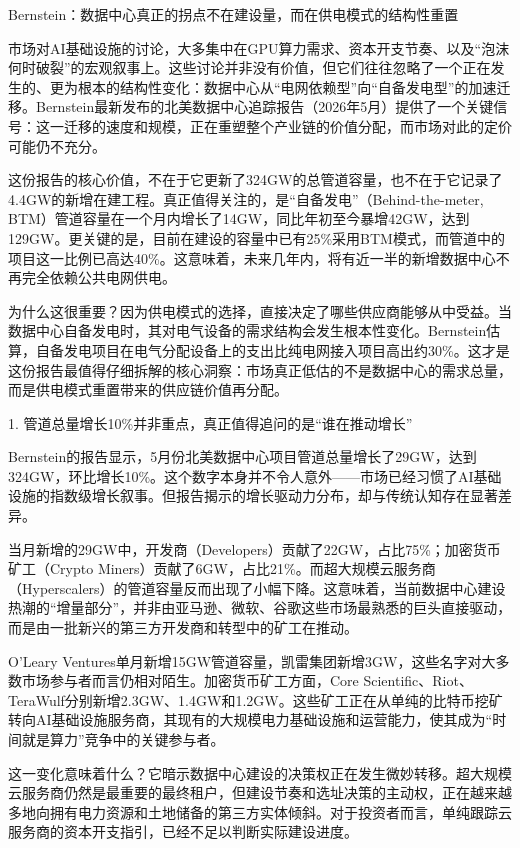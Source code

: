\documentclass[11pt]{ctexart}
\begin{document}
Bernstein：数据中心真正的拐点不在建设量，而在供电模式的结构性重置

市场对AI基础设施的讨论，大多集中在GPU算力需求、资本开支节奏、以及“泡沫何时破裂”的宏观叙事上。这些讨论并非没有价值，但它们往往忽略了一个正在发生的、更为根本的结构性变化：数据中心从“电网依赖型”向“自备发电型”的加速迁移。Bernstein最新发布的北美数据中心追踪报告（2026年5月）提供了一个关键信号：这一迁移的速度和规模，正在重塑整个产业链的价值分配，而市场对此的定价可能仍不充分。

这份报告的核心价值，不在于它更新了324GW的总管道容量，也不在于它记录了4.4GW的新增在建工程。真正值得关注的，是“自备发电”（Behind-the-meter, BTM）管道容量在一个月内增长了14GW，同比年初至今暴增42GW，达到129GW。更关键的是，目前在建设的容量中已有25\%采用BTM模式，而管道中的项目这一比例已高达40\%。这意味着，未来几年内，将有近一半的新增数据中心不再完全依赖公共电网供电。

为什么这很重要？因为供电模式的选择，直接决定了哪些供应商能够从中受益。当数据中心自备发电时，其对电气设备的需求结构会发生根本性变化。Bernstein估算，自备发电项目在电气分配设备上的支出比纯电网接入项目高出约30\%。这才是这份报告最值得仔细拆解的核心洞察：市场真正低估的不是数据中心的需求总量，而是供电模式重置带来的供应链价值再分配。

1. 管道总量增长10\%并非重点，真正值得追问的是“谁在推动增长”

Bernstein的报告显示，5月份北美数据中心项目管道总量增长了29GW，达到324GW，环比增长10\%。这个数字本身并不令人意外——市场已经习惯了AI基础设施的指数级增长叙事。但报告揭示的增长驱动力分布，却与传统认知存在显著差异。

当月新增的29GW中，开发商（Developers）贡献了22GW，占比75\%；加密货币矿工（Crypto Miners）贡献了6GW，占比21\%。而超大规模云服务商（Hyperscalers）的管道容量反而出现了小幅下降。这意味着，当前数据中心建设热潮的“增量部分”，并非由亚马逊、微软、谷歌这些市场最熟悉的巨头直接驱动，而是由一批新兴的第三方开发商和转型中的矿工在推动。

O'Leary Ventures单月新增15GW管道容量，凯雷集团新增3GW，这些名字对大多数市场参与者而言仍相对陌生。加密货币矿工方面，Core Scientific、Riot、TeraWulf分别新增2.3GW、1.4GW和1.2GW。这些矿工正在从单纯的比特币挖矿转向AI基础设施服务商，其现有的大规模电力基础设施和运营能力，使其成为“时间就是算力”竞争中的关键参与者。

这一变化意味着什么？它暗示数据中心建设的决策权正在发生微妙转移。超大规模云服务商仍然是最重要的最终租户，但建设节奏和选址决策的主动权，正在越来越多地向拥有电力资源和土地储备的第三方实体倾斜。对于投资者而言，单纯跟踪云服务商的资本开支指引，已经不足以判断实际建设进度。
\end{document}
